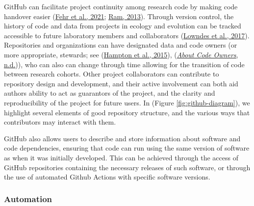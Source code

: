 GitHub can facilitate project continuity among research code by making code handover easier (\protect\hyperlink{ref-D4C4k4ak}{Fehr et al., 2021}; \protect\hyperlink{ref-4ny1onB0}{Ram, 2013}).
Through version control, the history of code and data from projects in ecology and evolution can be tracked accessible to future laboratory members and collaborators (\protect\hyperlink{ref-3DKwn1sY}{Lowndes et al., 2017}).
Repositories and organizations can have designated data and code owners (or more appropriate, stewards; see (\protect\hyperlink{ref-iIEKCTLU}{Hampton et al., 2015}), (\protect\hyperlink{ref-s91uGRZ2}{\emph{About Code Owners}, n.d.})), who can also can change through time allowing for the transition of code between research cohorts.
Other project collaborators can contribute to repository design and development, and their active involvement can both aid authors ability to act as guarantors of the project, and the clarity and reproducibility of the project for future users.
In (Figure \ref{fig:github-diagram}), we highlight several elements of good repository structure, and the various ways that contributors may interact with them.

GitHub also allows users to describe and store information about software and code dependencies, ensuring that code can run using the same version of software as when it was initially developed.
This can be achieved through the access of GitHub repositories containing the necessary releases of such software, or through the use of automated Github Actions with specific software versions.

\hypertarget{automation}{%
\subsubsection{Automation}\label{automation}}

